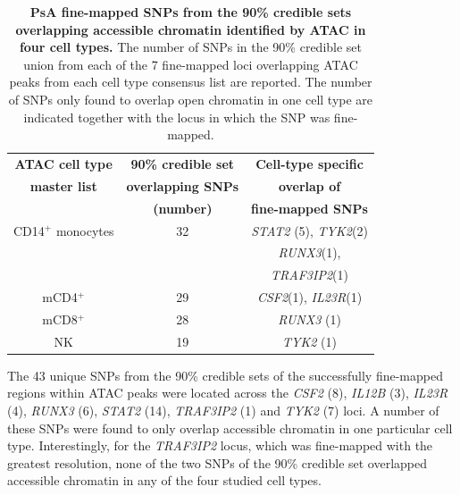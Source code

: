 \begin{table}[htbp]
\centering
\begin{tabular}{@{} c c c}
\toprule
\textbf{ATAC cell type} & \textbf{90\% credible set}   &  \textbf{Cell-type specific}  \\
\textbf{master list}    & \textbf{overlapping SNPs}    &   \textbf{overlap of}   \\
									      &	\textbf{(number)}				     &   \textbf{fine-mapped SNPs} \\
\midrule
\midrule
 CD14$^+$ monocytes    & 32                            &  \textit{STAT2} (5), \textit{TYK2}(2)\\ 
                       &                               &  \textit{RUNX3}(1),\\
											 &                               &  \textit{TRAF3IP2}(1) \\
 mCD4$^+$              & 29                            &  \textit{CSF2}(1), \textit{IL23R}(1) \\
 mCD8$^+$              & 28                            &  \textit{RUNX3} (1)        \\
 NK                    & 19                            &  \textit{TYK2} (1)       \\
\bottomrule
\end{tabular}
\medskip %
\caption[PsA fine-mapped SNPs from the 90\% credible sets overlapping accessible chromatin identified by ATAC in four cell types.]{\textbf{PsA fine-mapped SNPs from the 90\% credible sets overlapping accessible chromatin identified by ATAC in four cell types.} The number of SNPs in the 90\% credible set union from each of the 7 fine-mapped loci overlapping ATAC peaks from each cell type consensus list are reported. The number of SNPs only found to overlap open chromatin in one cell type are indicated together with the locus in which the SNP was fine-mapped.}
\label{tab:PSA_fine_mapping_ATAC_overlap}
\end{table}


The 43 unique SNPs from the 90\% credible sets of the successfully fine-mapped regions within ATAC peaks were located across the \textit{CSF2} (8), \textit{IL12B} (3), \textit{IL23R} (4), \textit{RUNX3} (6), \textit{STAT2} (14), \textit{TRAF3IP2} (1) and \textit{TYK2} (7) loci. A number of these SNPs were found to only overlap accessible chromatin in one particular cell type. Interestingly, for the \textit{TRAF3IP2} locus, which was fine-mapped with the greatest resolution, none of the two SNPs of the 90\% credible set overlapped accessible chromatin in any of the four studied cell types.



